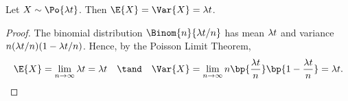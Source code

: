 \begin{proposition}
    Let $X \sim \Po{\l t}$. Then $\E{X} = \Var{X} = \l t$.
\end{proposition}
\begin{proof}
    The binomial distribution $\Binom{n}{\l t / n}$ has mean $\lambda t$ and variance $n(\lambda t / n)(1 - \lambda t / n)$. Hence, by the Poisson Limit Theorem, \[\E{X} = \lim_{n \to \infty} \l t = \l t \quad \tand \quad \Var{X} = \lim_{n \to \infty} n\bp{\frac{\l t}{n}}\bp{1 - \frac{\l t}{n}} = \l t.\]
\end{proof}
